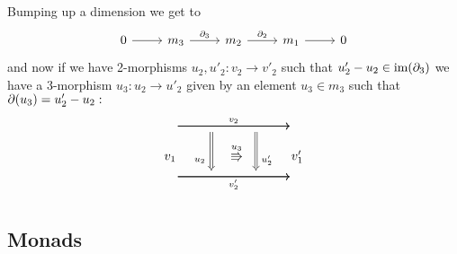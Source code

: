 \documentclass[12pt]{article}
\begin{document}
Bumping up a dimension we get to
\[\begin{tikzcd} 0 \arrow{r} & m_3 \arrow{r}{\bdy_3} & m_2 \arrow{r}{\bdy_2} & m_1 \arrow{r} & 0 \end{tikzcd} \]
and now if we have 2-morphisms $u_2, u'_2: v_2 \to v'_2 $
such that $u'_2-u_2\in \mbox{im}(\partial_3)$
we have a 3-morphism $u_3:u_2\to u'_2$ 
given by an element $u_3\in m_3$ such that $\partial(u_3)=u'_2-u_2:$
$$
\begin{tikzcd}[column sep = tiny, row sep = tiny]
\ \arrow{rrr}[]{v_2} \arrow{rrr}[pos=0.3,name=U,below]{} \arrow{rrr}[pos=0.7,name=UU,below]{} & \ & \ &\  \\
v_1         & {}_{u_2} \ \ \ \ \ \overset{u_3}{\Rrightarrow} & {}_{u'_2}    & v_1' \\
\ \arrow{rrr}[below]{v_2'} \arrow{rrr}[pos=0.3,name=D]{} \arrow{rrr}[pos=0.7,name=DD]{}   &  \   &\  & \   \\
\arrow[Rightarrow,to path=(U) -- (D),left]{}
\arrow[Rightarrow,to path=(UU) -- (DD),left]{}
\end{tikzcd}
$$





%

\subsection{Monads}
\end{document}
